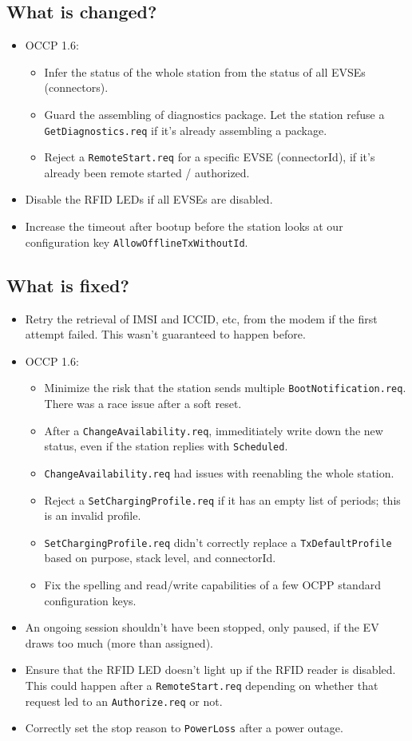 \documentclass{scrartcl}
\begin{document}
\subsection*{What is changed?}
\begin{itemize}
\item OCCP 1.6:
  \begin{itemize}
  \item Infer the status of the whole station from the status of all EVSEs
    (connectors).
  \item Guard the assembling of diagnostics package. Let the station refuse a
    \verb|GetDiagnostics.req| if it's already assembling a package.
  \item Reject a \verb|RemoteStart.req| for a specific EVSE (connectorId), if
    it's already been remote started / authorized.
  \end{itemize}
\item Disable the RFID LEDs if all EVSEs are disabled.
\item Increase the timeout after bootup before the station looks at our
  configuration key \verb|AllowOfflineTxWithoutId|.
\end{itemize}
\subsection*{What is fixed?}
\begin{itemize}
\item Retry the retrieval of IMSI and ICCID, etc, from the modem if the first
  attempt failed. This wasn't guaranteed to happen before.
\item OCCP 1.6:
  \begin{itemize}
  \item Minimize the risk that the station sends multiple
    \verb|BootNotification.req|. There was a race issue after a soft reset.
  \item After a \verb|ChangeAvailability.req|, immeditiately write down the
    new status, even if the station replies with \verb|Scheduled|.
  \item \verb|ChangeAvailability.req| had issues with reenabling the whole
    station.
  \item Reject a \verb|SetChargingProfile.req| if it has an empty list of
    periods; this is an invalid profile.
  \item \verb|SetChargingProfile.req| didn't correctly replace a
    \verb|TxDefaultProfile| based on purpose, stack level, and connectorId.
  \item Fix the spelling and read/write capabilities of a few OCPP standard
    configuration keys.
  \end{itemize}
\item An ongoing session shouldn't have been stopped, only paused, if the EV
  draws too much (more than assigned).
\item Ensure that the RFID LED doesn't light up if the RFID reader is
  disabled. This could happen after a \verb|RemoteStart.req| depending on
  whether that request led to an \verb|Authorize.req| or not.
\item Correctly set the stop reason to \verb|PowerLoss| after a power outage.
\end{itemize}
\end{document}

